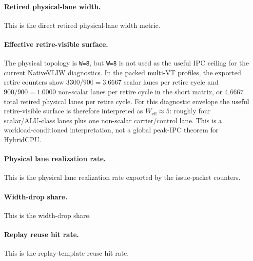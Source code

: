 \documentclass[twocolumn]{article}
\begin{document}
\paragraph{Retired physical-lane width.}

This is the direct retired physical-lane width metric.

\paragraph{Effective retire-visible surface.}
The physical topology is \texttt{W=8}, but \texttt{W=8} is not used as the useful IPC ceiling for the current NativeVLIW diagnostics. In the packed multi-VT profiles, the exported retire counters show \(3300/900=3.6667\) scalar lanes per retire cycle and \(900/900=1.0000\) non-scalar lanes per retire cycle in the short matrix, or \(4.6667\) total retired physical lanes per retire cycle. For this diagnostic envelope the useful retire-visible surface is therefore interpreted as \(W_{\mathrm{eff}}\approx5\): roughly four scalar/ALU-class lanes plus one non-scalar carrier/control lane. This is a workload-conditioned interpretation, not a global peak-IPC theorem for HybridCPU.

\paragraph{Physical lane realization rate.}

This is the physical lane realization rate exported by the issue-packet counters.

\paragraph{Width-drop share.}

This is the width-drop share.

\paragraph{Replay reuse hit rate.}

This is the replay-template reuse hit rate.
\end{document}
